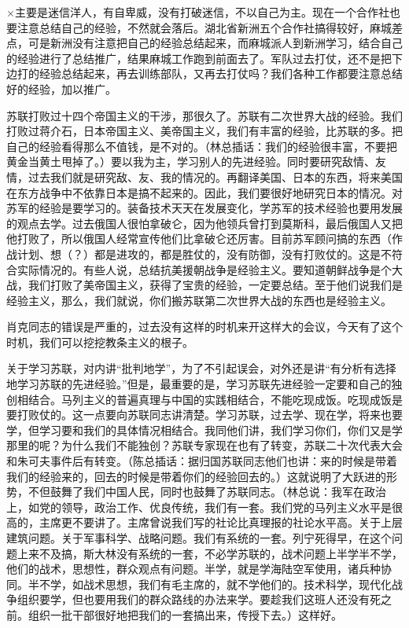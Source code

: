 ×主要是迷信洋人，有自卑威，没有打破迷信，不以自己为主。现在一个合作社也要注意总结自己的经验，不然就会落后。湖北省新洲五个合作社搞得较好，麻城差点，可是新洲没有注意把自己的经验总结起来，而麻城派人到新洲学习，结合自己的经验进行了总结推广，结果麻城工作跑到前面去了。军队过去打仗，还不是把下边打的经验总结起来，再去训练部队，又再去打仗吗？我们各种工作都要注意总结好的经验，加以推广。

苏联打败过十四个帝国主义的干涉，那很久了。苏联有二次世界大战的经验。我们打败过蒋介石，日本帝国主义、美帝国主义，我们有丰富的经验，比苏联的多。把自己的经验看得那么不值钱，是不对的。（林总插话：我们的经验很丰富，不要把黄金当黄土甩掉了。）要以我为主，学习别人的先进经验。同时要研究敌情、友情，过去我们就是研究敌、友、我的情况的。再翻译美国、日本的东西，将来美国在东方战争中不依靠日本是搞不起来的。因此，我们要很好地研究日本的情况。对苏军的经验是要学习的。装备技术天天在发展变化，学苏军的技术经验也要用发展的观点去学。过去俄国人很怕拿破仑，因为他领兵曾打到莫斯科，最后俄国人又把他打败了，所以俄国人经常宣传他们比拿破仑还厉害。目前苏军顾问搞的东西（作战计划、想（？）都是进攻的，都是胜仗的，没有防御，没有打败仗的。这是不符合实际情况的。有些人说，总结抗美援朝战争是经验主义。要知道朝鲜战争是个大战，我们打败了美帝国主义，获得了宝贵的经验，一定要总结。至于他们说我们是经验主义，那么，我们就说，你们搬苏联第二次世界大战的东西也是经验主义。

肖克同志的错误是严重的，过去没有这样的时机来开这样大的会议，今天有了这个时机，我们可以挖挖教条主义的根子。

关于学习苏联，对内讲“批判地学”，为了不引起误会，对外还是讲“有分析有选择地学习苏联的先进经验。”但是，最重要的是，学习苏联先进经验一定要和自己的独创相结合。马列主义的普遍真理与中国的实践相结合，不能吃现成饭。吃现成饭是要打败仗的。这一点要向苏联同志讲清楚。学习苏联，过去学、现在学，将来也要学，但学习要和我们的具体情况相结合。我同他们讲，我们学习你们，你们又是学那里的呢？为什么我们不能独创？苏联专家现在也有了转变，苏联二十次代表大会和朱可夫事件后有转变。（陈总插话：据归国苏联同志他们也讲：来的时候是带着我们的经验来的，回去的时候是带着你们的经验回去的。）这就说明了大跃进的形势，不但鼓舞了我们中国人民，同时也鼓舞了苏联同志。（林总说：我军在政治上，如党的领导，政治工作、优良传统，我们有一套。我们党的马列主义水平是很高的，主席更不要讲了。主席曾说我们写的社论比真理报的社论水平高。关于上层建筑问题。关于军事科学、战略问题。我们有系统的一套。列宁死得早，在这个问题上来不及搞，斯大林没有系统的一套，不必学苏联的，战术问题上半学半不学，他们的战术，思想性，群众观点有问题。半学，就是学海陆空军使用，诸兵种协同。半不学，如战术思想，我们有毛主席的，就不学他们的。技术科学，现代化战争组织要学，但也要用我们的群众路线的办法来学。要趁我们这班人还没有死之前。组织一批干部很好地把我们的一套搞出来，传授下去。）这样好。

